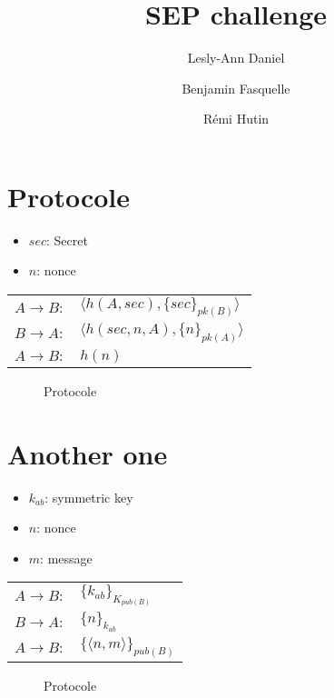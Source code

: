 \documentclass[10pt,a4paper]{article}
\author{Lesly-Ann Daniel \and Benjamin Fasquelle \and Rémi Hutin}
\title{SEP challenge}
\begin{document}
\maketitle


\section{Protocole}

\begin{itemize}
\item $sec$: Secret
\item $n$: nonce
\end{itemize}

\begin{table}[!h]
\centering
\begin{tabular}{ll}
$A \rightarrow B:$ & $\langle h(A, sec), \{sec\}_{pk(B)} \rangle $ \\
$B \rightarrow A:$ & $\langle h(sec, n, A), \{n\}_{pk(A)} \rangle $\\
$A \rightarrow B:$ & $h(n)$\\
\end{tabular}
\end{table}


\begin{figure}[!ht]
\centering
\begin{msc}{Protocole}
  \nextlevel
  \nextlevel
  \nextlevel
  \nextlevel
\end{msc}
\end{figure}




\clearpage
\section{Another one}

\begin{itemize}
\item $k_{ab}$: symmetric key
\item $n$: nonce
\item $m$: message
\end{itemize}



\begin{table}[!h]
\centering
\begin{tabular}{ll}
$A \rightarrow B:$ & $\{k_{ab}\}_{K_{pub(B)}}$ \\
$B \rightarrow A:$ & $\{n\}_{k_{ab}}$ \\
$A \rightarrow B:$ & $\{ \langle n, m \rangle \}_{pub(B)}$
\end{tabular}
\end{table}


\begin{figure}[!ht]
\centering
\begin{msc}{Protocole}
  \nextlevel
  \nextlevel
  \nextlevel
  \nextlevel
\end{msc}
\end{figure}
\end{document}
